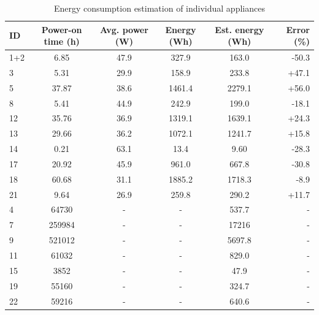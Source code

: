 \begin{table}
  \centering
  \begin{tabular}{lccccr}
  \hline
  ID & Power-on time (h) & Avg. power (W) & Energy (Wh) & Est. energy (Wh) & Error (\%) \\
  \hline
﻿1+2& 6.85  & 47.9  & 327.9   &  163.0   &  -50.3 \\
3  & 5.31  & 29.9  & 158.9   &  233.8   &  +47.1 \\
5  & 37.87 & 38.6  & 1461.4  & 2279.1   & +56.0 \\
8  & 5.41  & 44.9  & 242.9   & 199.0    & -18.1 \\
12 & 35.76 & 36.9  & 1319.1  & 1639.1   & +24.3 \\
13 & 29.66 & 36.2  & 1072.1  & 1241.7   & +15.8 \\
14 & 0.21  & 63.1  & 13.4    & 9.60     & -28.3 \\
17 & 20.92 & 45.9  & 961.0   & 667.8    & -30.8 \\
18 & 60.68 & 31.1  & 1885.2  & 1718.3   & -8.9 \\
21 & 9.64  & 26.9  & 259.8   & 290.2    & +11.7 \\
  \hline
4 & 64730  & -  & -   & 537.7    & - \\
7 & 259984  & -  & -   & ﻿17216    & - \\
9 & 521012  & -  & -   & 5697.8    & - \\
11 & 61032  & -  & -   & 829.0    & - \\
15 & 3852  & -  & -   & 47.9    & - \\
19 & 55160  & -  & -   & 324.7    & - \\
22 & 59216  & -  & -   & 640.6    & - \\
  \hline    
  \end{tabular}
  \caption{Energy consumption estimation of individual appliances}
  \label{tab:disagg}
\end{table}

